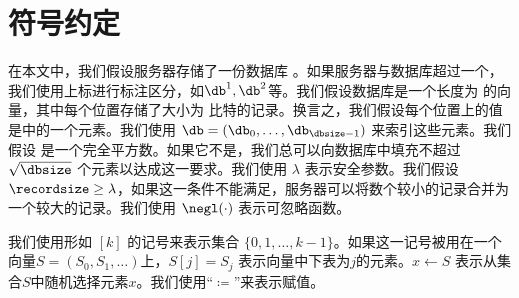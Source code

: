 \section{符号约定}
在本文中，我们假设服务器\server 存储了一份数据库 \db。如果服务器与数据库超过一个，我们使用上标进行标注区分，如$\db^{1},\db^{2}$等。我们假设数据库是一个长度为 \dbsize 的向量，其中每个位置存储了大小为 \recordsize 比特的记录。换言之，我们假设每个位置上的值是\recordfield 中的一个元素。我们使用 $\db = (\db_0,\dots,\db_{\dbsize-1})$ 来索引这些元素。我们假设 \dbsize 是一个完全平方数。如果它不是，我们总可以向数据库中填充不超过 $\sqrt{\dbsize}$ 个元素以达成这一要求。我们使用 $\lambda$ 表示安全参数。我们假设$\recordsize \ge \lambda$，如果这一条件不能满足，服务器可以将数个较小的记录合并为一个较大的记录。我们使用 $\negl(\cdot)$ 表示可忽略函数。

我们使用形如 $[k]$ 的记号来表示集合 $\{0,1,\dots,k-1\}$。如果这一记号被用在一个向量$S = (S_0, S_1, \dots)$上，$S[j]=S_j$ 表示向量中下表为$j$的元素。$x\leftarrow S$ 表示从集合$S$中随机选择元素$x$。我们使用``$\coloneqq$''来表示赋值。

